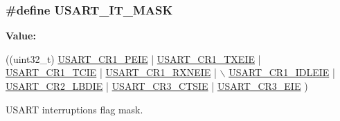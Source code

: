 \subsubsection[{\texorpdfstring{U\+S\+A\+R\+T\+\_\+\+I\+T\+\_\+\+M\+A\+SK}{USART_IT_MASK}}]{\setlength{\rightskip}{0pt plus 5cm}\#define U\+S\+A\+R\+T\+\_\+\+I\+T\+\_\+\+M\+A\+SK}\hypertarget{group___u_s_a_r_t___private___constants_ga034341c78baf4241878310a22ec76a06}{}\label{group___u_s_a_r_t___private___constants_ga034341c78baf4241878310a22ec76a06}
{\bfseries Value\+:}
\begin{DoxyCode}
((uint32\_t) \hyperlink{group___peripheral___registers___bits___definition_ga27405d413b6d355ccdb076d52fef6875}{USART\_CR1\_PEIE} | \hyperlink{group___peripheral___registers___bits___definition_ga70422871d15f974b464365e7fe1877e9}{USART\_CR1\_TXEIE} | 
      \hyperlink{group___peripheral___registers___bits___definition_gaa17130690a1ca95b972429eb64d4254e}{USART\_CR1\_TCIE} | \hyperlink{group___peripheral___registers___bits___definition_ga91118f867adfdb2e805beea86666de04}{USART\_CR1\_RXNEIE} | \(\backslash\)
                                   \hyperlink{group___peripheral___registers___bits___definition_ga5221d09eebd12445a20f221bf98066f8}{USART\_CR1\_IDLEIE} | 
      \hyperlink{group___peripheral___registers___bits___definition_gaa02ef5d22553f028ea48e5d9f08192b4}{USART\_CR2\_LBDIE} | \hyperlink{group___peripheral___registers___bits___definition_ga636d5ec2e9556949fc68d13ad45a1e90}{USART\_CR3\_CTSIE} | \hyperlink{group___peripheral___registers___bits___definition_gaaed1a39c551b1641128f81893ff558d0}{USART\_CR3\_EIE} )
\end{DoxyCode}


U\+S\+A\+RT interruptions flag mask. 

